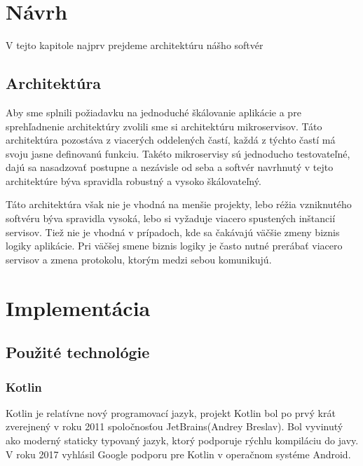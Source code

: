   

\section{Návrh} 

 V tejto kapitole najprv prejdeme architektúru nášho softvér 


  

\subsection{Architektúra} 

 Aby sme splnili požiadavku na jednoduché škálovanie aplikácie a pre sprehľadnenie architektúry zvolili sme si architektúru mikroservisov. Táto architektúra pozostáva z viacerých oddelených častí, každá z týchto častí má svoju jasne definovanú funkciu. Takéto mikroservisy sú jednoducho testovateľné, dajú sa nasadzovať postupne a nezávisle od seba a softvér navrhnutý v tejto architektúre býva spravidla robustný a vysoko škálovateľný.  

  

Táto architektúra však nie je vhodná na menšie projekty, lebo réžia vzniknutého softvéru býva spravidla vysoká, lebo si vyžaduje viacero spustených inštancií servisov. Tiež nie je vhodná v prípadoch, kde sa čakávajú väčšie zmeny biznis logiky aplikácie. Pri väčšej smene biznis logiky je často nutné prerábať viacero servisov a zmena protokolu, ktorým medzi sebou komunikujú. 

  

  

\section{Implementácia} 


  

\subsection{Použité technológie} 

  

\subsubsection{Kotlin} 

 Kotlin je relatívne nový programovací jazyk, projekt Kotlin bol po prvý krát zverejnený v roku 2011 spoločnosťou JetBrains(Andrey Breslav). Bol vyvinutý ako moderný staticky typovaný jazyk, ktorý podporuje rýchlu kompiláciu do javy. V roku 2017 vyhlásil Google podporu pre Kotlin v operačnom systéme Android.  

